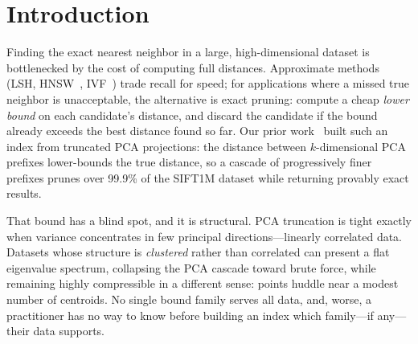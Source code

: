 \documentclass[sigconf,nonacm]{acmart}
\begin{document}
\begin{abstract}
statistic over evaluated points; it wins to $k\approx10$ and honestly loses
in RAM at $k=100$. Out of core, the cascade's fetch set concentrates in few
$k$-means clusters (27 of 1024 on the embeddings), and a measured two-tier
layout under \texttt{O\_DIRECT} cold reads answers exact queries
$7$--$17\times$ faster than a full disk scan while reading
$40$--$730\times$ fewer bytes. Against ADSampling, the state-of-the-art
statistical distance-comparison pruner, our in-RAM work counts are mixed
(we win at 96--128 dimensions, it wins on the embeddings), but its
$\Delta d = 32$-dimension floor forces it to touch \emph{every} vector, so
it cannot leave RAM: deterministic bounds pay precisely where bytes are
expensive. Exactness is verified on every query of every experiment. All
code, diagnostics, and experiments are public.
\end{abstract}

\maketitle

\section{Introduction}

Finding the exact nearest neighbor in a large, high-dimensional dataset is
bottlenecked by the cost of computing full distances. Approximate methods
(LSH, HNSW~\cite{hnsw}, IVF~\cite{faiss}) trade recall for speed; for
applications where a missed true neighbor is unacceptable, the alternative is
exact pruning: compute a cheap \emph{lower bound} on each candidate's
distance, and discard the candidate if the bound already exceeds the best
distance found so far. Our prior work~\cite{paper1} built such an index from
truncated PCA projections: the distance between $k$-dimensional PCA prefixes
lower-bounds the true distance, so a cascade of progressively finer prefixes
prunes over 99.9\% of the SIFT1M dataset while returning provably exact
results.

That bound has a blind spot, and it is structural. PCA truncation is tight
exactly when variance concentrates in few principal directions---linearly
correlated data. Datasets whose structure is \emph{clustered} rather than
correlated can present a flat eigenvalue spectrum, collapsing the PCA
cascade toward brute force, while remaining highly compressible in a
different sense: points huddle near a modest number of centroids. No single
bound family serves all data, and, worse, a practitioner has no way to know
before building an index which family---if any---their data supports.
\end{document}
